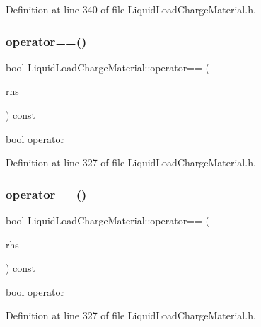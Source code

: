 Definition at line 340 of file Liquid\+Load\+Charge\+Material.\+h.

\mbox{\label{class_liquid_load_charge_material_ad2090d1628f26e46339e9e164b47d3a2}} 
\subsubsection{\texorpdfstring{operator==()}{operator==()}\hspace{0.1cm}{\footnotesize\ttfamily [1/3]}}
{\footnotesize\ttfamily bool Liquid\+Load\+Charge\+Material\+::operator== (\begin{DoxyParamCaption}\item[{const \hyperlink{class_liquid_load_charge_material}{Liquid\+Load\+Charge\+Material} \&}]{rhs }\end{DoxyParamCaption}) const\hspace{0.3cm}{\ttfamily [inline]}}

bool operator 

Definition at line 327 of file Liquid\+Load\+Charge\+Material.\+h.

\mbox{\label{class_liquid_load_charge_material_ad2090d1628f26e46339e9e164b47d3a2}} 
\subsubsection{\texorpdfstring{operator==()}{operator==()}\hspace{0.1cm}{\footnotesize\ttfamily [2/3]}}
{\footnotesize\ttfamily bool Liquid\+Load\+Charge\+Material\+::operator== (\begin{DoxyParamCaption}\item[{const \hyperlink{class_liquid_load_charge_material}{Liquid\+Load\+Charge\+Material} \&}]{rhs }\end{DoxyParamCaption}) const\hspace{0.3cm}{\ttfamily [inline]}}

bool operator 

Definition at line 327 of file Liquid\+Load\+Charge\+Material.\+h.

